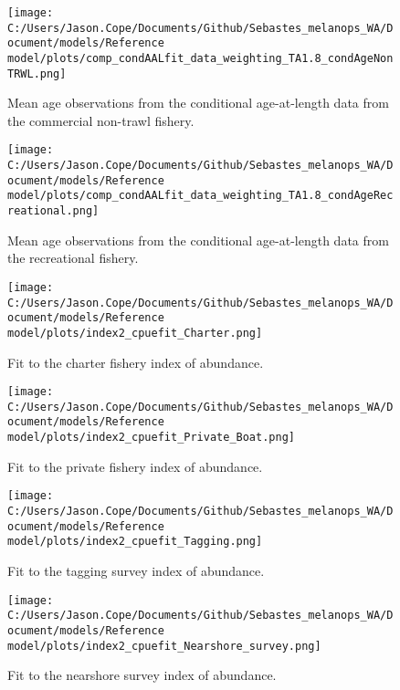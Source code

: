 \documentclass[11pt,
  english,
  letterpaper,
]{article}
\begin{document}
\begin{figure}
\centering
\texttt{[image: C:/Users/Jason.Cope/Documents/Github/Sebastes\_melanops\_WA/Document/models/Reference model/plots/comp\_condAALfit\_data\_weighting\_TA1.8\_condAgeNonTRWL.png]}
\caption{Mean age observations from the conditional age-at-length data from the commercial non-trawl fishery.\label{fig:nontrawl-mean-caal}}
\end{figure}

\begin{figure}
\centering
\texttt{[image: C:/Users/Jason.Cope/Documents/Github/Sebastes\_melanops\_WA/Document/models/Reference model/plots/comp\_condAALfit\_data\_weighting\_TA1.8\_condAgeRecreational.png]}
\caption{Mean age observations from the conditional age-at-length data from the recreational fishery.\label{fig:rec-mean-caal}}
\end{figure}

\begin{figure}
\centering
\texttt{[image: C:/Users/Jason.Cope/Documents/Github/Sebastes\_melanops\_WA/Document/models/Reference model/plots/index2\_cpuefit\_Charter.png]}
\caption{Fit to the charter fishery index of abundance.\label{fig:charter-index-fit}}
\end{figure}

\begin{figure}
\centering
\texttt{[image: C:/Users/Jason.Cope/Documents/Github/Sebastes\_melanops\_WA/Document/models/Reference model/plots/index2\_cpuefit\_Private\_Boat.png]}
\caption{Fit to the private fishery index of abundance.\label{fig:private-index-fit}}
\end{figure}

\begin{figure}
\centering
\texttt{[image: C:/Users/Jason.Cope/Documents/Github/Sebastes\_melanops\_WA/Document/models/Reference model/plots/index2\_cpuefit\_Tagging.png]}
\caption{Fit to the tagging survey index of abundance.\label{fig:tag-index-fit}}
\end{figure}

\begin{figure}
\centering
\texttt{[image: C:/Users/Jason.Cope/Documents/Github/Sebastes\_melanops\_WA/Document/models/Reference model/plots/index2\_cpuefit\_Nearshore\_survey.png]}
\caption{Fit to the nearshore survey index of abundance.\label{fig:nearshore-index-fit}}
\end{figure}
\end{document}
